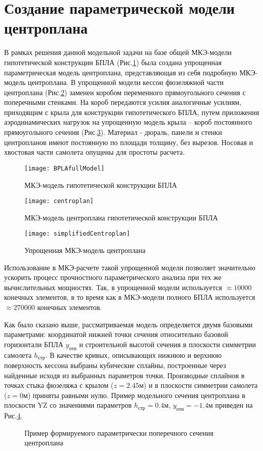 \section{Создание параметрической модели центроплана}
\label{sec:creationOfModel}

В рамках решения данной модельной задачи на базе общей МКЭ-модели гипотетической конструкции БПЛА (Рис.\ref{fig:fullMKE}) была создана упрощенная параметрическая модель центроплана, представляющая из себя подробную МКЭ-модель центроплана. В упрощенной модели кессон фюзеляжной части центроплана (Рис.\ref{fig:centroplanMKE}) заменен коробом переменного прямоугольного сечения с поперечными стенками. На короб передаются усилия аналогичные усилиям, приходящим с крыла для конструкции гипотетического БПЛА, путем приложения аэродинамических нагрузок на упрощенную модель крыла -- короб постоянного прямоугольного сечения (Рис.\ref{fig:simplifiedCentroplanMKE}). Материал - дюраль, панели и стенки центропланов имеют постоянную по площади толщину, без вырезов. Носовая и хвостовая части самолета опущены для простоты расчета.  


\begin{figure}[ht]
\centering 
\texttt{[image: BPLAfullModel]}
\caption{МКЭ-модель гипотетической конструкции БПЛА}
\label{fig:fullMKE}
\end{figure}

\begin{figure}[ht]
\centering 
\texttt{[image: centroplan]}
\caption{МКЭ-модель центроплана гипотетической конструкции БПЛА}
\label{fig:centroplanMKE}
\end{figure}

\begin{figure}[ht]
\centering
\texttt{[image: simplifiedCentroplan]}
\caption{Упрощенная МКЭ-модель центроплана}
\label{fig:simplifiedCentroplanMKE}
\end{figure}

Использование в МКЭ-расчете такой упрощенной модели позволяет значительно ускорить процесс прочностного параметрического анализа при тех же вычислительных мощностях. Так, в упрощенной модели используется $\approx10000$ конечных элементов, в то время как в МКЭ-модели полного БПЛА используется $\approx270000$ конечных элементов.

Как было сказано выше, рассматриваемая модель определяется двумя базовыми параметрами: координатой нижней точки сечения относительно базовой горизонтали БПЛА $y_\text{отн}$ и строительной высотой сечения в плоскости симметрии самолета $h_\text{стр}$. В качестве кривых, описывающих нижнюю и верхнюю поверхность кессона выбраны кубические сплайны, построенные через найденные исходя из выбранных параметров точки. Производные сплайнов в точках стыка фюзеляжа с крылом ($z=2.45\text{м}$) и в плоскости симметрии самолета ($z=0\text{м}$) приняты равными нулю. Пример модельного сечения центроплана в плоскости YZ со значениями параметров $h_\text{стр}=0.4\text{м}$, $y_\text{отн} = -1.4\text{м}$ приведен на Рис.\ref{fig:KessSectionExample}.

\begin{figure}[ht]
\centering
\def\svgwidth{\textwidth}

\caption{Пример формируемого параметрически поперечного сечения центроплана}
\label{fig:KessSectionExample}
\end{figure}

